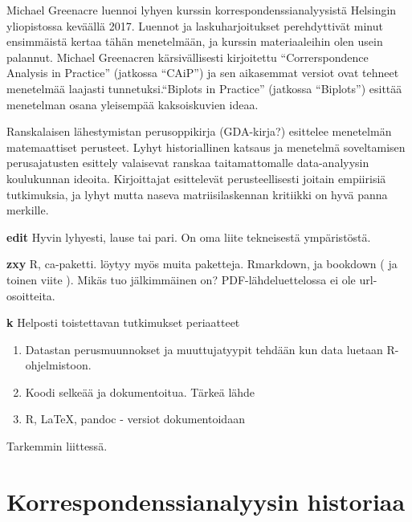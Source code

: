 \documentclass[
  finnish,
]{book}
\providecommand{\tightlist}{%
  \setlength{\itemsep}{0pt}\setlength{\parskip}{0pt}}
\begin{document}
Michael Greenacre luennoi lyhyen kurssin korrespondenssianalyysistä Helsingin
yliopistossa keväällä 2017\citep{RefWorks:doc:5b6ef091e4b0984fd9b8c0ca}. Luennot ja
laskuharjoitukset perehdyttivät minut ensimmäistä kertaa tähän menetelmään, ja
kurssin materiaaleihin olen usein palannut.
Michael Greenacren kärsivällisesti kirjoitettu ``Correrspondence Analysis in
Practice'' (jatkossa ``CAiP'') \citep{RefWorks:doc:5a857a43e4b0ed2d44664d78} ja sen
aikasemmat versiot ovat tehneet menetelmää laajasti tunnetuksi.``Biplots in Practice''
(jatkossa ``Biplots'') \citep{RefWorks:doc:5a857a43e4b0ed2d44664d7c} esittää menetelman
osana yleisempää kaksoiskuvien ideaa.

Ranskalaisen lähestymistan perusoppikirja\citep{RefWorks:doc:5a857a43e4b0ed2d44664d75} (GDA-kirja?)
esittelee menetelmän matemaattiset perusteet.
Lyhyt historiallinen katsaus ja menetelmä soveltamisen perusajatusten esittely
valaisevat ranskaa taitamattomalle data-analyysin koulukunnan ideoita.
Kirjoittajat esittelevät perusteellisesti joitain empiirisiä tutkimuksia, ja
lyhyt mutta naseva matriisilaskennan kritiikki on hyvä panna merkille.

\textbf{edit} Hyvin lyhyesti, lause tai pari. On oma liite tekneisestä ympäristöstä.

\textbf{zxy} R, ca-paketti. löytyy myös muita paketteja.
Rmarkdown\citep{RefWorks:doc:5b6b346fe4b0c619b11b8a3e}, ja
bookdown (\citep{RefWorks:doc:5b6b36dde4b09b7ec442bf8b} ja toinen viite \citep{R-bookdown}).
Mikäs tuo jälkimmäinen on? PDF-lähdeluettelossa ei ole url-osoitteita.

\textbf{k} Helposti toistettavan tutkimukset periaatteet

\begin{enumerate}
\def\labelenumi{\arabic{enumi}.}
\tightlist
\item
  Datastan perusmuunnokset ja muuttujatyypit tehdään kun data luetaan
  R-ohjelmistoon.
\item
  Koodi selkeää ja dokumentoitua. Tärkeä lähde \citep{RefWorks:doc:5c3759c2e4b0085b307c82b5}
\item
  R, LaTeX, pandoc - versiot dokumentoidaan
\end{enumerate}

Tarkemmin liittessä.

\hypertarget{korrespondenssianalyysin-historiaa}{%
\section{Korrespondenssianalyysin historiaa}\label{korrespondenssianalyysin-historiaa}}
\end{document}
